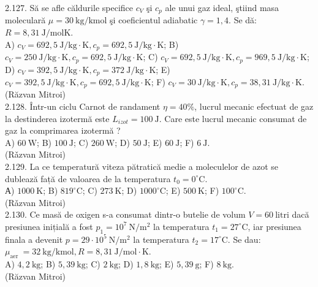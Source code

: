 2.127. Să se afle căldurile specifice $c_{V}$ şi $c_{p}$ ale unui gaz ideal, ştiind masa moleculară $\mu=30 \mathrm{~kg} / \mathrm{kmol}$ şi coeficientul adiabatic $\gamma=1,4$. Se dă: $R=8,31 \mathrm{~J} / \mathrm{molK}$.\\ A) $c_{V}=692,5 \mathrm{~J} / \mathrm{kg} \cdot \mathrm{K}, c_{p}=692,5 \mathrm{~J} / \mathrm{kg} \cdot \mathrm{K}$; B) $c_{V}=250 \mathrm{~J} / \mathrm{kg} \cdot \mathrm{K}, c_{p}=692,5 \mathrm{~J} / \mathrm{kg} \cdot \mathrm{K}$; C) $c_{V}=692,5 \mathrm{~J} / \mathrm{kg} \cdot \mathrm{K}, c_{p}=969,5 \mathrm{~J} / \mathrm{kg} \cdot \mathrm{K}$; D) $c_{V}=392,5 \mathrm{~J} / \mathrm{kg} \cdot \mathrm{K}, c_{p}=372 \mathrm{~J} / \mathrm{kg} \cdot \mathrm{K}$; E) $c_{V}=392,5 \mathrm{~J} / \mathrm{kg} \cdot \mathrm{K}, c_{p}=692,5 \mathrm{~J} / \mathrm{kg} \cdot \mathrm{K}$; F) $c_{V}=30 \mathrm{~J} / \mathrm{kg} \cdot \mathrm{K}, c_{p}=38,31 \mathrm{~J} / \mathrm{kg} \cdot \mathrm{K}$.\\ (Răzvan Mitroi)\\

2.128. Într-un ciclu Carnot de randament $\eta=40 \%$, lucrul mecanic efectuat de gaz la destinderea izotermă este $L_{i z o t}=100 \mathrm{~J}$. Care este lucrul mecanic consumat de gaz la comprimarea izotermă ?\\ A) $60 \mathrm{~W}$; B) $100 \mathrm{~J}$; C) $260 \mathrm{~W}$; D) $50 \mathrm{~J}$; E) $60 \mathrm{~J}$; F) $6 \mathrm{~J}$.\\ (Rǎzvan Mitroi)\\

2.129. La ce temperatură viteza pătratică medie a moleculelor de azot se dublează față de valoarea de la temperatura $t_{0}=0^{\circ} \mathrm{C}$.\\ А) $1000 \mathrm{~K}$; B) $819^{\circ} \mathrm{C}$; C) $273 \mathrm{~K}$; D) $1000^{\circ} \mathrm{C}$; E) $500 \mathrm{~K}$; F) $100^{\circ} \mathrm{C}$.\\ (Rǎzvan Mitroi)\\

2.130. Ce masă de oxigen s-a consumat dintr-o butelie de volum $V=60 \mathrm{~litri}$ dacă presiunea inițială a fost $p_{1}=10^{7} \mathrm{~N} / \mathrm{m}^{2}$ la temperatura $t_{1}=27^{\circ} \mathrm{C}$, iar presiunea finala a devenit $p=29 \cdot 10^{5} \mathrm{~N} / \mathrm{m}^{2}$ la temperatura $t_{2}=17^{\circ} \mathrm{C}$. Se dau: $\mu_{\text {aer }}=32 \mathrm{~kg} / \mathrm{kmol}, R=8,31 \mathrm{~J} / \mathrm{mol} \cdot \mathrm{K}$.\\ A) $4,2 \mathrm{~kg}$; B) $5,39 \mathrm{~kg}$; C) $2 \mathrm{~kg}$; D) $1,8 \mathrm{~kg}$; E) $5,39 \mathrm{~g}$; F) $8 \mathrm{~kg}$.\\ (Răzvan Mitroi)\\

